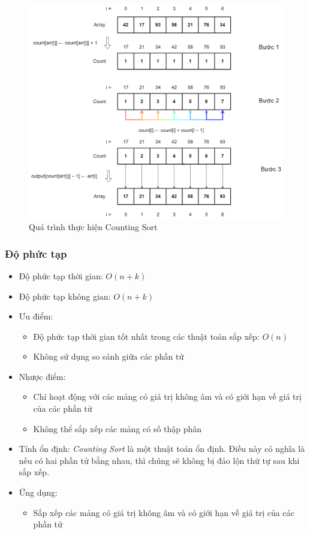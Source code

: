 \begin{figure}[H]
    \centering
    \includegraphics[width=0.75\linewidth]{img/counting_sort/1.png}
    \caption{Quá trình thực hiện Counting Sort}
\end{figure}

\subsubsection{Độ phức tạp}

\begin{itemize}
    \item Độ phức tạp thời gian: $O(n + k)$
    \item Độ phức tạp không gian: $O(n + k)$
    \item Ưu điểm:
        \begin{itemize}
            \item Độ phức tạp thời gian tốt nhất trong các thuật toán sắp xếp: $O(n)$
            \item Không sử dụng so sánh giữa các phần tử
        \end{itemize}
    \item Nhược điểm:
        \begin{itemize}
            \item Chỉ hoạt động với các mảng có giá trị không âm và có giới hạn về giá trị của các phần tử
            \item Không thể sắp xếp các mảng có số thập phân
        \end{itemize}
    \item Tính ổn định: \textit{Counting Sort} là một thuật toán ổn định. Điều này có nghĩa là nếu có hai phần tử bằng nhau, thì chúng sẽ không bị đảo lộn thứ tự sau khi sắp xếp.
    \item Ứng dụng:
        \begin{itemize}
            \item Sắp xếp các mảng có giá trị không âm và có giới hạn về giá trị của các phần tử
        \end{itemize}
\end{itemize}
